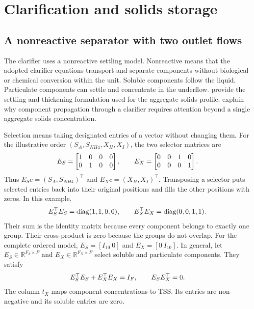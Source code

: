 \section{Clarification and solids storage}

\subsection{A nonreactive separator with two outlet flows}

The clarifier uses a nonreactive settling model. Nonreactive means that the adopted clarifier equations transport and separate components without biological or chemical conversion within the unit. Soluble components follow the liquid. Particulate components can settle and concentrate in the underflow. \citet{Takacs1991} provide the settling and thickening formulation used for the aggregate solids profile. \citet{JeppssonDiehl1996} explain why component propagation through a clarifier requires attention beyond a single aggregate solids concentration.

Selection means taking designated entries of a vector without changing them. For the illustrative order $(S_A,S_{NH4},X_H,X_I)$, the two selector matrices are
\begin{equation}
\equationname{Illustrative soluble and particulate component selectors}
E_S=\begin{bmatrix}1&0&0&0\\0&1&0&0\end{bmatrix},\qquad
E_X=\begin{bmatrix}0&0&1&0\\0&0&0&1\end{bmatrix}.
\end{equation}
Thus $E_Sc=(S_A,S_{NH4})^\top$ and $E_Xc=(X_H,X_I)^\top$. Transposing a selector puts selected entries back into their original positions and fills the other positions with zeros. In this example,
\begin{equation}
\equationname{Illustrative coordinate projectors from the component selectors}
E_S^\top E_S=\operatorname{diag}(1,1,0,0),\qquad
E_X^\top E_X=\operatorname{diag}(0,0,1,1).
\end{equation}
Their sum is the identity matrix because every component belongs to exactly one group. Their cross-product is zero because the groups do not overlap. For the complete ordered model, $E_S=[I_{10}\ 0]$ and $E_X=[0\ I_{10}]$. In general, let $E_S\in\mathbb R^{F_S\times F}$ and $E_X\in\mathbb R^{F_X\times F}$ select soluble and particulate components. They satisfy
\begin{equation}
\equationname{Completeness and orthogonality identities of the component selectors}
E_S^\top E_S+E_X^\top E_X=I_F,\qquad E_SE_X^\top=0.
\end{equation}
The column $t_X$ maps component concentrations to TSS. Its entries are non-negative and its soluble entries are zero.

